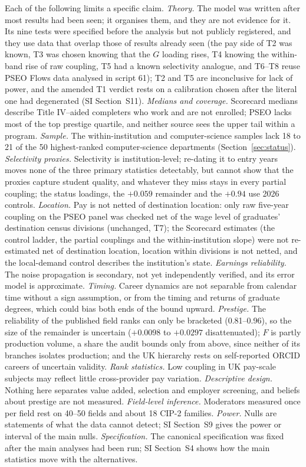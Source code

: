 \documentclass[11pt]{article}
\newcommand{\SI}[1]{SI Section~S#1}
\newcommand{\SItheory}{\SI{11}}
\begin{document}
Each of the following limits a specific claim. \emph{Theory.} The model was written after most results had been
seen; it organises them, and they are not evidence for it. Its nine tests were specified before the analysis but
not publicly registered, and they use data that overlap those of results already seen (the pay side of T2 was
known, T3 was chosen knowing that the $G$ loading rises, T4 knowing the within-band rise of raw coupling, T5 had a
known selectivity analogue, and T6--T8 reuse PSEO Flows data analysed in script 61); T2 and T5 are inconclusive for
lack of power, and the amended T1 verdict rests on a calibration chosen after the literal one had degenerated
(\SItheory). \emph{Medians and coverage.} Scorecard medians describe Title IV--aided completers who
work and are not enrolled; PSEO lacks most of the top prestige quartile, and neither source sees the upper tail
within a program. \emph{Sample.} The within-institution and computer-science samples lack 18 to 21 of the 50 highest-ranked
computer-science departments (Section~\ref{sec:status}). \emph{Selectivity proxies.} Selectivity is institution-level; re-dating it
to entry years moves none of the three primary statistics detectably, but cannot show that the proxies capture
student quality, and whatever they miss stays in every partial coupling; the status loadings, the $+0.059$
remainder and the $+0.94$ use 2026 controls. \emph{Location.} Pay is not netted of destination location: only
raw five-year coupling on the PSEO panel was checked net of the wage level of graduates' destination census
divisions (unchanged, T7); the Scorecard estimates (the control ladder, the partial couplings and the
within-institution slope) were not re-estimated net of destination location, location within divisions is not
netted, and the local-demand control describes the institution's state. \emph{Earnings
reliability.} The noise propagation is secondary, not yet independently verified, and its error model is
approximate. \emph{Timing.} Career dynamics are not separable from calendar time without a sign assumption, or from
the timing and returns of graduate degrees, which could bias both ends of the bound upward. \emph{Prestige.} The
reliability of the published field ranks can only be bracketed (0.81--0.96), so the size of the remainder is
uncertain ($+0.0098$ to $+0.0297$ disattenuated); $F$ is partly production volume, a share the audit bounds only
from above, since neither of its branches isolates production; and the UK hierarchy rests on
self-reported ORCID careers of uncertain validity. \emph{Rank statistics.} Low coupling in UK pay-scale subjects may reflect little cross-provider pay variation.
\emph{Descriptive design.} Nothing here separates value added, selection and employer screening, and beliefs about
prestige are not measured. \emph{Field-level inference.} Moderators measured once per field rest on 40--50 fields
and about 18 CIP-2 families. \emph{Power.} Nulls are statements of what the data cannot detect; \SI{9} gives the
power or interval of the main nulls. \emph{Specification.} The canonical specification was fixed after the main
analyses had been run; \SI{4} shows how the main statistics move with the alternatives.
\end{document}
